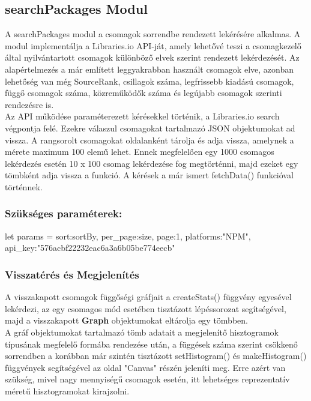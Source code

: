 \subsection{searchPackages Modul}

A searchPackages modul a csomagok sorrendbe rendezett lekérésére alkalmas. A modul implementálja a Libraries.io API-ját, amely lehetővé teszi a csomagkezelő által nyilvántartott csomagok különböző elvek szerint rendezett lekérdezését. Az alapértelmezés a már említett leggyakrabban használt csomagok elve, azonban lehetőség van még SourceRank, csillagok száma, legfrissebb kiadású csomagok, függő csomagok száma, közreműködők száma és legújabb csomagok szerinti rendezésre is.\\

Az API működése paraméterezett kérésekkel történik, a Libraries.io search végpontja felé. Ezekre válaszul csomagokat tartalmazó JSON objektumokat ad vissza. A rangsorolt csomagokat oldalanként tárolja és adja vissza, amelynek a mérete maximum 100 elemű lehet. Ennek megfelelően egy 1000 csomagos lekérdezés esetén 10 x 100 csomag lekérdezése fog megtörténni, majd ezeket egy tömbként adja vissza a funkció. A kérések a már ismert fetchData() funkcióval történnek.

\subsubsection{Szükséges paraméterek:}
\begin{js}
	let params = {
		sort:sortBy, 
		per_page:size,
		page:1,
		platforms:"NPM",
		api_key:"576acbf22232eac6a3a6b05be774eecb"
	}
\end{js}

\subsubsection{Visszatérés és Megjelenítés}

A visszakapott csomagok függőségi gráfjait a createStats() függvény egyesével lekérdezi, az egy csomagos mód esetében tisztázott lépéssorozat segítségével, majd a visszakapott \textbf{Graph} objektumokat eltárolja egy tömbben.\\

A gráf objektumokat tartalmazó tömb adatait a megjelenítő hisztogramok típusának megfelelő formába rendezése után, a függések száma szerint csökkenő sorrendben a korábban már szintén tisztázott setHistogram() és makeHistogram() függvények segítségével az oldal "Canvas" részén jeleníti meg. Erre azért van szükség, mivel nagy mennyiségű csomagok esetén, itt lehetséges reprezentatív méretű hisztogramokat kirajzolni.


